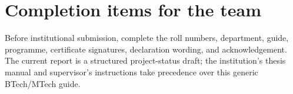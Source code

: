 \documentclass[12pt,a4paper]{report}
\begin{document}
\section{Completion items for the team}
Before institutional submission, complete the roll numbers, department, guide, programme, certificate signatures, declaration wording, and acknowledgement. The current report is a structured project-status draft; the institution's thesis manual and supervisor's instructions take precedence over this generic BTech/MTech guide.



\end{document}
